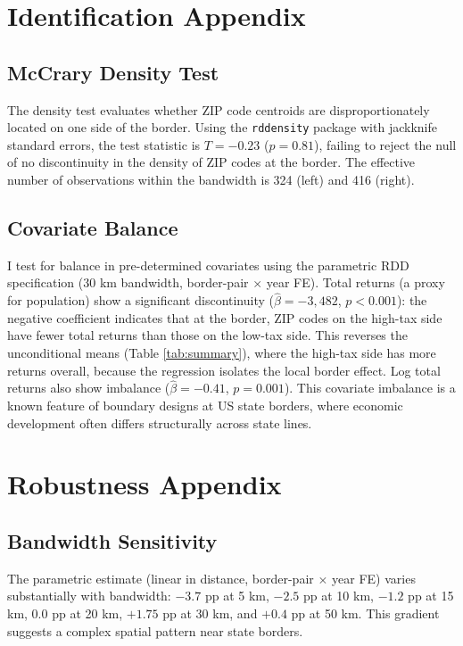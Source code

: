 \documentclass[12pt]{article}
\begin{document}
\section{Identification Appendix}

\subsection{McCrary Density Test}

The \citet{mccrary2008manipulation} density test evaluates whether ZIP code centroids are disproportionately located on one side of the border. Using the \texttt{rddensity} package with jackknife standard errors, the test statistic is $T = -0.23$ ($p = 0.81$), failing to reject the null of no discontinuity in the density of ZIP codes at the border. The effective number of observations within the bandwidth is 324 (left) and 416 (right).

\subsection{Covariate Balance}

I test for balance in pre-determined covariates using the parametric RDD specification (30 km bandwidth, border-pair $\times$ year FE). Total returns (a proxy for population) show a significant discontinuity ($\hat{\beta} = -3{,}482$, $p < 0.001$): the negative coefficient indicates that at the border, ZIP codes on the high-tax side have fewer total returns than those on the low-tax side. This reverses the unconditional means (Table \ref{tab:summary}), where the high-tax side has more returns overall, because the regression isolates the local border effect. Log total returns also show imbalance ($\hat{\beta} = -0.41$, $p = 0.001$). This covariate imbalance is a known feature of boundary designs at US state borders, where economic development often differs structurally across state lines.

\section{Robustness Appendix}

\subsection{Bandwidth Sensitivity}

The parametric estimate (linear in distance, border-pair $\times$ year FE) varies substantially with bandwidth: $-3.7$ pp at 5 km, $-2.5$ pp at 10 km, $-1.2$ pp at 15 km, 0.0 pp at 20 km, $+1.75$ pp at 30 km, and $+0.4$ pp at 50 km. This gradient suggests a complex spatial pattern near state borders.
\end{document}

